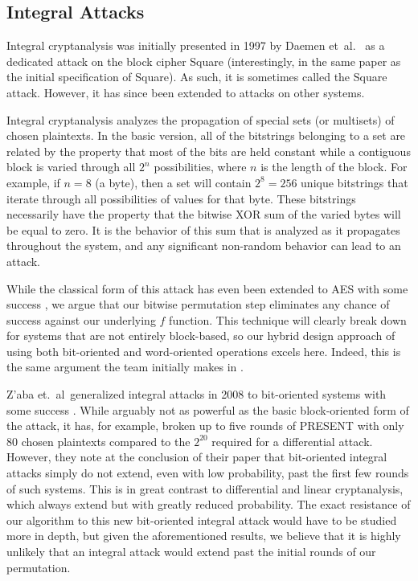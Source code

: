 \subsection{Integral Attacks}
Integral cryptanalysis was initially presented in 1997 by Daemen et~al.\ \cite{Daemen1997_Square} as a dedicated attack on the block cipher Square (interestingly, in the same paper as the initial specification of Square).
As such, it is sometimes called the Square attack.
However, it has since been extended to attacks on other systems. 

Integral cryptanalysis analyzes the propagation of special sets (or multisets) of chosen plaintexts.
In the basic version, all of the bitstrings belonging to a set are related by the property that most of the bits are held constant while a contiguous block is varied through all $2^n$ possibilities, where $n$ is the length of the block. 
For example, if $n = 8$ (a byte), then a set will contain $2^8 = 256$ unique bitstrings that iterate through all possibilities of values for that byte.
These bitstrings necessarily have the property that the bitwise XOR sum of the varied bytes will be equal to zero.
It is the behavior of this sum that is analyzed as it propagates throughout the system, and any significant non-random behavior can lead to an attack.

While the classical form of this attack has even been extended to AES with some success \cite{Ferguson2001_Improved}, we argue that our bitwise permutation step eliminates any chance of success against our underlying $f$ function. 
This technique will clearly break down for systems that are not entirely block-based, so our hybrid design approach of using both bit-oriented and word-oriented operations excels here.
Indeed, this is the same argument the \Keccak team initially makes in \cite{Bertoni2011_KeccakReference}.

Z'aba et.~al\ generalized integral attacks in 2008 to bit-oriented systems with some success \cite{ZAba2008_BitPatternIntegralAttacks}. 
While arguably not as powerful as the basic block-oriented form of the attack, it has, for example, broken up to five rounds of PRESENT with only 80 chosen plaintexts compared to the $2^{20}$ required for a differential attack.
However, they note at the conclusion of their paper that bit-oriented integral attacks simply do not extend, even with low probability, past the first few rounds of such systems.
This is in great contrast to differential and linear cryptanalysis, which always extend but with greatly reduced probability.
The exact resistance of our algorithm to this new bit-oriented integral attack would have to be studied more in depth, but given the aforementioned results, we believe that it is highly unlikely that an integral attack would extend past the initial rounds of our permutation.

